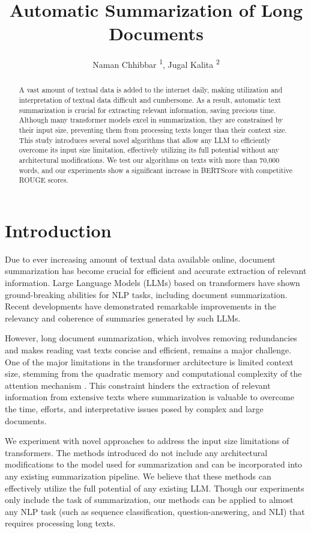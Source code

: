\documentclass[letterpaper]{article} %
\title{Automatic Summarization of Long Documents}
\author{
	Naman Chhibbar \textsuperscript{\rm 1},
	Jugal Kalita \textsuperscript{\rm 2}
}
\begin{document}
\maketitle

\begin{abstract}
	A vast amount of textual data is added to the internet daily, making utilization
	and interpretation of textual data difficult and cumbersome.
	As a result, automatic text summarization is crucial for extracting relevant
	information, saving precious time.
	Although many transformer models excel in summarization, they are constrained
	by their input size, preventing them from processing texts longer than their
	context size.
	This study introduces several novel algorithms that allow any LLM to efficiently
	overcome its input size limitation, effectively utilizing its full potential without
	any architectural modifications.
	We test our algorithms on texts with more than 70,000 words, and our experiments show
	a significant increase in BERTScore with competitive ROUGE scores.
\end{abstract}


\section{Introduction}

	Due to ever increasing amount of textual data available online, document summarization
	has become crucial for efficient and accurate extraction of relevant information.
	Large Language Models (LLMs) based on transformers have shown ground-breaking abilities for
	NLP tasks, including document summarization.
	Recent developments have demonstrated remarkable improvements in the relevancy and
	coherence of summaries generated by such LLMs.

	However, long document summarization, which involves removing redundancies and makes reading
	vast texts concise and efficient, remains a major challenge.
	One of the major limitations in the transformer architecture is limited context size,
	stemming from the quadratic memory and computational complexity of the attention mechanism
	\cite{du2023improving}.
	This constraint hinders the extraction of relevant information from extensive texts where
	summarization is valuable to overcome the time, efforts, and interpretative issues posed by
	complex and large documents.

	We experiment with novel approaches to address the input size limitations of transformers.
	The methods introduced do not include any architectural modifications to the model
	used for summarization and can be incorporated into any existing summarization pipeline.
	We believe that these methods can effectively utilize the full potential of any existing LLM.
	Though our experiments only include the task of summarization, our methods can be applied
	to almost any NLP task (such as sequence classification, question-answering, and NLI) that
	requires processing long texts.
\end{document}
